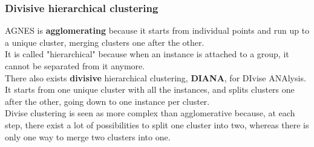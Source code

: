 \begin{frame}
\frametitle{Divisive hierarchical clustering}
AGNES is {\bf agglomerating} because it starts from individual points and run up to a unique cluster, merging clusters one after the other. \\
\vspace{0.3cm}
It is called "hierarchical" because when an instance is attached to a group, it cannot be separated from it anymore.\\
\vspace{0.3cm}
There also exists {\bf divisive} hierarchical clustering, {\bf DIANA}, for DIvise ANAlysis. It starts from one unique cluster with all the instances, and splits clusters one after the other, going down to one instance per cluster. \\
\vspace{0.3cm}
Divise clustering is seen as more complex than agglomerative because, at each step, there exist a lot of possibilities to split one cluster into two, whereas there is only one way to merge two clusters into one.
\end{frame}
